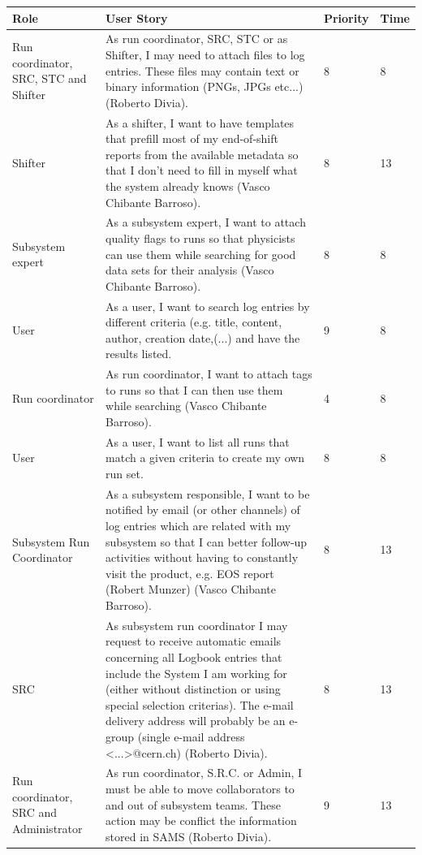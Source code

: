 \documentclass[paper=a4, fontsize=11pt,twoside]{scrartcl}	%
\begin{document}
\begin{longtable}{ | p{3cm} | p{8cm} | p{1cm} | l |}
\hline
Role & User Story & Priority & Time \\ \hline
Run coordinator, SRC, STC and Shifter& As run coordinator, SRC, STC or as Shifter, I may need to attach files to log entries. These files may contain text or binary information (PNGs, JPGs etc...) (Roberto Divia). & 8 & 8 \\ \hline
Shifter &  As a shifter, I want to have templates that prefill most of my end-of-shift reports from the available metadata so that I don’t need to fill in myself what the system already knows (Vasco Chibante Barroso). & 8 & 13 \\ \hline
Subsystem expert & As a subsystem expert, I want to attach quality flags to runs so that
physicists can use them while searching for good data sets for their analysis (Vasco Chibante Barroso). & 8 & 8 \\ \hline
User & As a user, I want to search log entries by different criteria (e.g. title, content, author, creation date,(...) and have the results listed. & 9 & 8 \\ \hline
Run coordinator &  As run coordinator, I want to attach tags to runs so that I can then use them while searching (Vasco Chibante Barroso). & 4 & 8 \\ \hline
User &  As a user, I want to list all runs that match a given criteria to create my own run set. & 8 & 8 \\ \hline
Subsystem Run Coordinator &  As a subsystem responsible, I want to be notified by email (or other channels) of log entries which are related with my subsystem so that I can better follow-up activities without having to constantly visit the product, e.g. EOS report (Robert Munzer) (Vasco Chibante Barroso). & 8 & 13 \\ \hline
SRC & As subsystem run coordinator I may request to receive automatic emails concerning all Logbook entries that include the System I am working for (either without distinction or using special selection criterias). The e-mail delivery address will probably be an e-group (single e-mail address <...>@cern.ch) (Roberto Divia). & 8 & 13 \\ \hline
Run coordinator, SRC and Administrator &  As run coordinator, S.R.C. or Admin, I must be able to move collaborators to and out of subsystem teams. These action may be conflict the information stored in SAMS (Roberto Divia). & 9 & 13 \\ \hline
\end{longtable}
\end{document}
